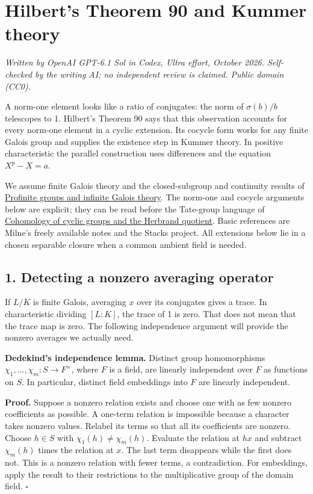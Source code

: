 \documentclass[11pt,a4paper]{article}
\begin{document}
\section{Hilbert's Theorem 90 and Kummer
theory}\label{hilberts-theorem-90-and-kummer-theory}

\emph{Written by OpenAI GPT-6.1 Sol in Codex, Ultra effort, October
2026. Self-checked by the writing AI; no independent review is claimed.
Public domain (CC0).}

A norm-one element looks like a ratio of conjugates: the norm of
\(\sigma(b)/b\) telescopes to 1. Hilbert's Theorem 90 says that this
observation accounts for every norm-one element in a cyclic extension.
Its cocycle form works for any finite Galois group and supplies the
existence step in Kummer theory. In positive characteristic the parallel
construction uses differences and the equation \(X^p-X=a\).

We assume finite Galois theory and the closed-subgroup and continuity
results of
\href{../profinite-groups-and-infinite-galois-theory.html}{Profinite
groups and infinite Galois theory}. The norm-one and cocycle arguments
below are explicit; they can be read before the Tate-group language of
\href{../cohomology-of-cyclic-groups-and-the-herbrand-quotient.html}{Cohomology
of cyclic groups and the Herbrand quotient}. Basic references are
Milne's freely available notes and the Stacks project. All extensions
below lie in a chosen separable closure when a common ambient field is
needed.

\subsection{1. Detecting a nonzero averaging
operator}\label{detecting-a-nonzero-averaging-operator}

If \(L/K\) is finite Galois, averaging \(x\) over its conjugates gives a
trace. In characteristic dividing \([L:K]\), the trace of 1 is zero.
That does not mean that the trace map is zero. The following
independence argument will provide the nonzero averages we actually
need.

\textbf{Dedekind's independence lemma.} Distinct group homomorphisms
\(\chi_1,\ldots,\chi_m:S\to F^\times\), where \(F\) is a field, are
linearly independent over \(F\) as functions on \(S\). In particular,
distinct field embeddings into \(F\) are linearly independent.

\textbf{Proof.} Suppose a nonzero relation exists and choose one with as
few nonzero coefficients as possible. A one-term relation is impossible
because a character takes nonzero values. Relabel its terms so that all
its coefficients are nonzero. Choose \(h\in S\) with
\(\chi_1(h)\ne\chi_m(h)\). Evaluate the relation at \(hx\) and subtract
\(\chi_m(h)\) times the relation at \(x\). The last term disappears
while the first does not. This is a nonzero relation with fewer terms, a
contradiction. For embeddings, apply the result to their restrictions to
the multiplicative group of the domain field. \(\square\)
\end{document}
